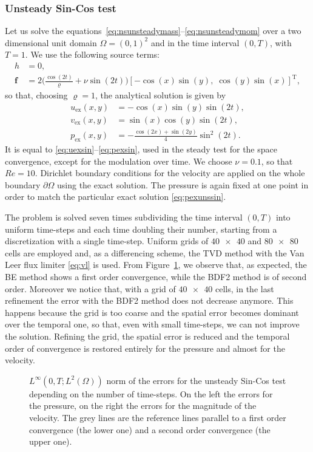 \subsubsection{Unsteady Sin-Cos test}
Let us solve the equations~\eqref{eq:nsunsteadymass}--\eqref{eq:nsunsteadymom} 
over a two dimensional unit domain $\Omega=(0,1)^2$ and in the time interval 
$(0,T)$, with $T=1$. We use the following source terms:
\begin{align}
h &= 0,\\
\mathbf{f} &= 2\Big(\frac{\cos(2t)}{\varrho} + \nu \sin(2t)\Big)[- \cos(x) 
\sin(y), \; 
\cos(y) \sin(x)]^\mathrm{T},
\end{align}
so that, choosing $\varrho=1$, the analytical solution is given by
\begin{align}
\label{eq:uexunssin}	u_\text{ex}(x,y) &= -\cos(x)\sin(y)\sin(2t),\\
v_\text{ex}(x,y) &= \sin(x)\cos(y)\sin(2t),\\
\label{eq:pexunssin}	p_\text{ex}(x,y) &= 
-\frac{\cos(2x)+\sin(2y)}{4}\sin^2(2t).
\end{align}
It is equal to \eqref{eq:uexsin}--\eqref{eq:pexsin}, used in the steady test 
for the space convergence, except for the modulation over time. We choose 
$\nu=0.1$, so that $Re=10$. Dirichlet boundary conditions for the velocity are 
applied on the whole boundary $\partial \Omega$ using the exact solution. 
The pressure is again fixed  at one point in order to match the particular exact solution 
\eqref{eq:pexunssin}.

The problem is solved seven times subdividing the time interval $(0,T)$ into 
uniform time-steps and each time doubling their number, starting from a 
discretization with a
single time-step. Uniform grids of $\num{40x40}$ and $\num{80x80}$ cells are 
employed and, as a differencing scheme, the TVD method with the Van Leer flux 
limiter \eqref{eq:vl} is used. From Figure~\ref{fig:timeerr}, we observe that, 
as expected, the BE method shows a first order convergence, while the BDF2 
method is of second order. Moreover we notice that, with a grid of 
$\num{40x40}$ cells, in the last refinement the error with the BDF2 method does 
not decrease anymore. This happens because the grid is too coarse and the 
spatial error becomes dominant over the temporal one, so that, even with small 
time-steps, we can not improve the solution.
Refining the grid, the spatial error is reduced and the temporal order of convergence is restored entirely for the pressure and almost for the velocity.
\begin{figure}
	\centering
	\subfloat{}
	\subfloat{}
	\caption[$L^\infty(0,T;L^2(\Omega))$ norm of the errors for the unsteady 
	Sin-Cos 
	test]{$L^\infty(0,T;L^2(\Omega))$ norm of the errors for the unsteady 
	Sin-Cos test 
	depending on the number of time-steps. On the left the errors for the 
	pressure, on the right the errors for the magnitude of the velocity. The grey lines are the reference lines parallel to a first order convergence (the lower one) and a
	second order convergence (the upper one).}
	\label{fig:timeerr}
\end{figure}
%
